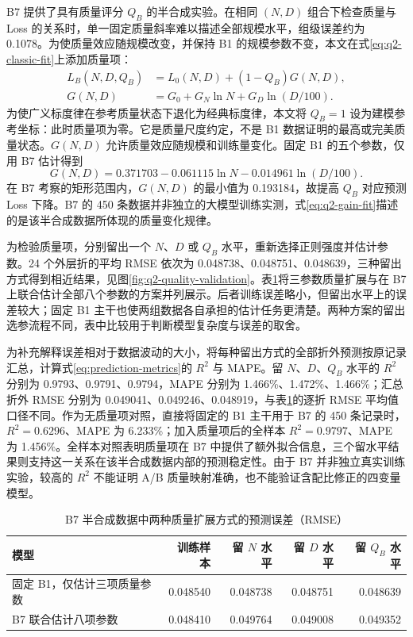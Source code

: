B7 提供了具有质量评分 $Q_B$ 的半合成实验。在相同 $(N,D)$ 组合下检查质量与 Loss 的关系时，单一固定质量斜率难以描述全部规模水平，组级误差约为 0.1078。为使质量效应随规模改变，并保持 B1 的规模参数不变，本文在式\eqref{eq:q2-classic-fit}上添加质量项：
\begin{align}
 L_B(N,D,Q_B)&=L_0(N,D)+(1-Q_B)G(N,D),\label{eq:q2-quality}\\
 G(N,D)&=G_0+G_N\ln N+G_D\ln(D/100).\label{eq:q2-gain}
\end{align}
为使广义标度律在参考质量状态下退化为经典标度律，本文将 $Q_B=1$ 设为建模参考坐标：此时质量项为零。它是质量尺度约定，不是 B1 数据证明的最高或完美质量状态。$G(N,D)$ 允许质量效应随规模和训练量变化。固定 B1 的五个参数，仅用 B7 估计得到
\begin{equation}
 G(N,D)=0.371703-0.061115\ln N-0.014961\ln(D/100).
 \label{eq:q2-gain-fit}
\end{equation}
在 B7 考察的矩形范围内，$G(N,D)$ 的最小值为 0.193184，故提高 $Q_B$ 对应预测 Loss 下降。B7 的 450 条数据并非独立的大模型训练实测，式\eqref{eq:q2-gain-fit}描述的是该半合成数据所体现的质量变化规律。

为检验质量项，分别留出一个 $N$、$D$ 或 $Q_B$ 水平，重新选择正则强度并估计参数。24 个外层折的平均 RMSE 依次为 0.048738、0.048751、0.048639，三种留出方式得到相近结果，见图\ref{fig:q2-quality-validation}。表\ref{tab:q2-quality-models}将三参数质量扩展与在 B7 上联合估计全部八个参数的方案并列展示。后者训练误差略小，但留出水平上的误差较大；固定 B1 主干也使两组数据各自承担的估计任务更清楚。两种方案的留出选参流程不同，表中比较用于判断模型复杂度与误差的取舍。

为补充解释误差相对于数据波动的大小，将每种留出方式的全部折外预测按原记录汇总，计算式\eqref{eq:prediction-metrics}的 $R^2$ 与 MAPE。留 $N$、$D$、$Q_B$ 水平的 $R^2$ 分别为 0.9793、0.9791、0.9794，MAPE 分别为 1.466\%、1.472\%、1.466\%；汇总折外 RMSE 分别为 0.049041、0.049246、0.048919，与表\ref{tab:q2-quality-models}的逐折 RMSE 平均值口径不同。作为无质量项对照，直接将固定的 B1 主干用于 B7 的 450 条记录时，$R^2=0.6296$、MAPE 为 6.233\%；加入质量项后的全样本 $R^2=0.9797$、MAPE 为 1.456\%。全样本对照表明质量项在 B7 中提供了额外拟合信息，三个留水平结果则支持这一关系在该半合成数据内部的预测稳定性。由于 B7 并非独立真实训练实验，较高的 $R^2$ 不能证明 A/B 质量映射准确，也不能验证含配比修正的四变量模型。

\begin{table}[htbp]
 \centering\small
 \caption{B7 半合成数据中两种质量扩展方式的预测误差（RMSE）}
 \label{tab:q2-quality-models}
 \begin{tabular}{lrrrr}
 \toprule
 模型 & 训练样本 & 留 $N$ 水平 & 留 $D$ 水平 & 留 $Q_B$ 水平\\
 \midrule
 固定 B1，仅估计三项质量参数 & 0.048540 & 0.048738 & 0.048751 & 0.048639\\
 B7 联合估计八项参数 & 0.048410 & 0.049764 & 0.049008 & 0.049352\\
 \bottomrule
 \end{tabular}
\end{table}

